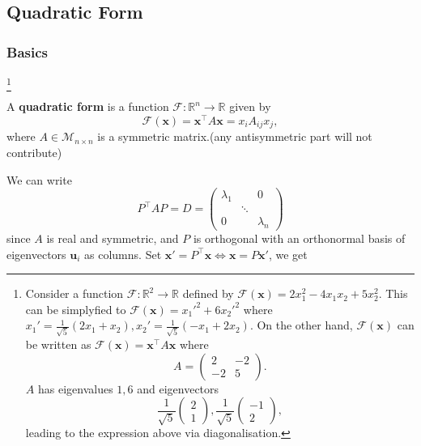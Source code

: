 \documentclass[a4paper]{article}
\begin{document}
    \subsection{Quadratic Form}
    \subsubsection{Basics}
    \begin{definition}\footnote{Consider a function $ \mathcal{F}:
        \mathbb{R}^{2}\to \mathbb{R} $ defined by $
        \mathcal{F}(\mathbf{x})=2x_1^2-4x_1x_2+5x_2^2 $. This can be
        simplyfied to $ \mathcal{F}(\mathbf{x})=x_1'^2+6x_2'^2 $
        where $ x_1'=\frac{1}{\sqrt{5}}(2x_1+x_2),
        x_2'=\frac{1}{\sqrt{5}}(-x_1+2x_2) $. On the other hand, $
        \mathcal{F}(\mathbf{x}) $ can be written as $
        \mathcal{F}(\mathbf{x})=\mathbf{x}^{\top}A\mathbf{x} $ where
        $$ A=
        \begin{pmatrix}
          2&-2\\
          -2&5
        \end{pmatrix}. $$
        $A$ has eigenvalues $ 1,6 $ and eigenvectors
        $$  \frac{1}{\sqrt{5}}
        \begin{pmatrix}
          2\\1
        \end{pmatrix}, \frac{1}{\sqrt{5}}
        \begin{pmatrix}
          -1\\2
        \end{pmatrix}, $$
      leading to the expression above via diagonalisation.}

      A \textbf{quadratic form} is a function $\mathcal{F}:
      \mathbb{R}^{n}\to \mathbb{R}$ given by
      \[
        \mathcal{F}(\mathbf{x}) = \mathbf{x}^{\top}A\mathbf{x}=x_iA_{ij}x_j,
      \]
      where $A\in \mathcal{M}_{n\times n}$ is a symmetric matrix.(any
      antisymmetric part will not contribute)
    \end{definition}
    We can write
    \[
      P^{\top}AP=D=
      \begin{pmatrix}
        \lambda_1&&0\\
        &\ddots&\\
        0&&\lambda_n
      \end{pmatrix}
    \]
    since $A$ is real and symmetric, and $P$ is orthogonal with an
    orthonormal basis of eigenvectors $\mathbf{u}_i$ as columns. Set
    $ \mathbf{x}'=P^{\top}\mathbf{x} \Leftrightarrow
    \mathbf{x}=P\mathbf{x}' $, we get
\end{document}

